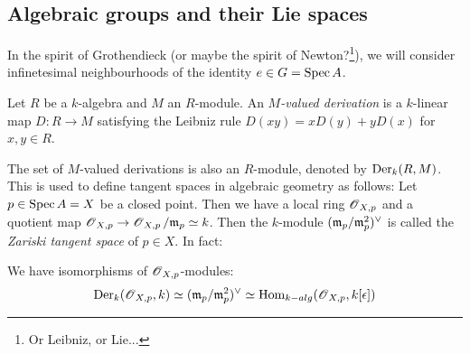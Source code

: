 \documentclass[11pt, english]{article}
\begin{document}
\subsection{Algebraic groups and their Lie spaces}

In the spirit of Grothendieck (or maybe the spirit of Newton?\footnote{Or Leibniz, or Lie...}), we will consider infinetesimal neighbourhoods of the identity $e \in G=\operatorname{Spec} A$.

\begin{defi}
 Let $R$ be a $k$-algebra and $M$ an $R$-module. An \emph{$M$-valued derivation} is a $k$-linear map $D:R \to M$ satisfying the Leibniz rule $D(xy)=xD(y) + yD(x)$ for $x,y \in R$.
\end{defi}

The set of $M$-valued derivations is also an $R$-module, denoted by $\operatorname{Der}_k(R,M)$. This is used to define tangent spaces in algebraic geometry as follows: Let $p \in \operatorname{Spec} A=X$ be a closed point. Then we have a local ring $\operatorname{\mathscr{O}}_{X,p}$ and a quotient map $\operatorname{\mathscr{O}}_{X,p} \to \operatorname{\mathscr{O}}_{X,p}/\mathfrak{m}_p \simeq  k$. Then the $k$-module $(\mathfrak{m}_p/\mathfrak{m}_p^2)^\vee$ is called the \emph{Zariski tangent space} of $p \in X$. In fact:
\begin{prop}
\label{propzariski}
We have isomorphisms of $\operatorname{\mathscr{O}}_{X,p}$-modules:
$$
\operatorname{Der}_k(\operatorname{\mathscr{O}}_{X,p},k) \simeq (\mathfrak{m}_p/\mathfrak{m}_p^2)^\vee \simeq \operatorname{Hom}_{k-alg}(\operatorname{\mathscr{O}}_{X,p},k[\epsilon])
$$
\end{prop}
\end{document}
